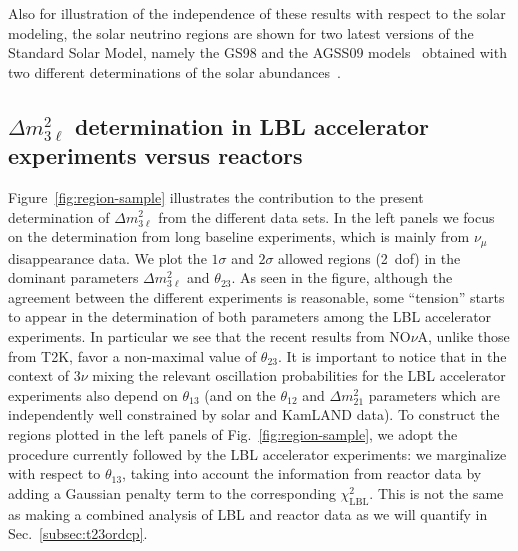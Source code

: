 \documentclass[a4paper, 11pt]{article}
\newcommand{\Dmq}{\Delta m^2}
\begin{document}
Also for illustration of the independence of these results with
respect to the solar modeling, the solar neutrino regions are shown
for two latest versions of the Standard Solar Model, namely the GS98
and the AGSS09 models~\cite{Bergstrom:2016cbh} obtained with two
different determinations of the solar
abundances~\cite{Vinyoles:2016djt}.

\subsection{$\Dmq_{3\ell}$ determination in LBL accelerator experiments
  versus reactors}
\label{subsec:dm32}

Figure~\ref{fig:region-sample} illustrates the contribution to the
present determination of $\Dmq_{3\ell}$ from the different data sets.
In the left panels we focus on the determination from long baseline
experiments, which is mainly from $\nu_\mu$ disappearance data. We
plot the $1\sigma$ and $2\sigma$ allowed regions (2~dof) in the
dominant parameters $\Dmq_{3\ell}$ and $\theta_{23}$. As seen in the
figure, although the agreement between the different experiments is
reasonable, some ``tension'' starts to appear in the determination of
both parameters among the LBL accelerator experiments.  In particular
we see that the recent results from NO$\nu$A, unlike those from T2K,
favor a non-maximal value of $\theta_{23}$. It is important to notice
that in the context of $3\nu$ mixing the relevant oscillation
probabilities for the LBL accelerator experiments also depend on
$\theta_{13}$ (and on the $\theta_{12}$ and $\Dmq_{21}$ parameters
which are independently well constrained by solar and KamLAND data).
To construct the regions plotted in the left panels of
Fig.~\ref{fig:region-sample}, we adopt the procedure currently
followed by the LBL accelerator experiments: we marginalize with
respect to $\theta_{13}$, taking into account the information from
reactor data by adding a Gaussian penalty term to the corresponding
$\chi^2_\text{LBL}$. This is not the same as making a combined
analysis of LBL and reactor data as we will quantify in
Sec.~\ref{subsec:t23ordcp}.
\end{document}
